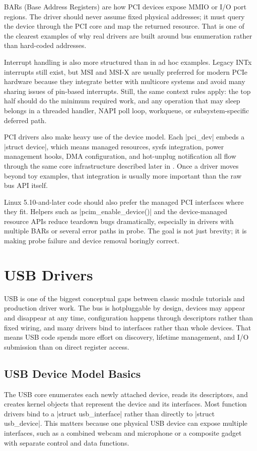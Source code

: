 \documentclass[10pt, oneside]{book}
\begin{document}
BARs (Base Address Registers) are how PCI devices expose MMIO or I/O port
regions.
The driver should never assume fixed physical addresses; it must query the
device through the PCI core and map the returned resource.
That is one of the clearest examples of why real drivers are built around bus
enumeration rather than hard-coded addresses.

Interrupt handling is also more structured than in ad hoc examples.
Legacy INTx interrupts still exist, but MSI and MSI-X are usually preferred for
modern PCIe hardware because they integrate better with multicore systems and
avoid many sharing issues of pin-based interrupts.
Still, the same context rules apply: the top half should do the minimum
required work, and any operation that may sleep belongs in a threaded handler,
NAPI poll loop, workqueue, or subsystem-specific deferred path.

PCI drivers also make heavy use of the device model.
Each \cpp|pci_dev| embeds a \cpp|struct device|, which means managed resources,
sysfs integration, power management hooks, DMA configuration, and hot-unplug
notification all flow through the same core infrastructure described later in
.
Once a driver moves beyond toy examples, that integration is usually more
important than the raw bus API itself.

Linux 5.10-and-later code should also prefer the managed PCI interfaces where they fit.
Helpers such as \cpp|pcim_enable_device()| and the device-managed resource
APIs reduce teardown bugs dramatically, especially in drivers with multiple BARs
or several error paths in probe.
The goal is not just brevity; it is making probe failure and device removal
boringly correct.

\section{USB Drivers}
\label{sec:usb}
USB is one of the biggest conceptual gaps between classic module tutorials and
production driver work.
The bus is hotpluggable by design, devices may appear and disappear at any
time, configuration happens through descriptors rather than fixed wiring, and
many drivers bind to interfaces rather than whole devices.
That means USB code spends more effort on discovery, lifetime management, and
I/O submission than on direct register access.

\subsection{USB Device Model Basics}
\label{sec:usb_basics}
The USB core enumerates each newly attached device, reads its descriptors, and
creates kernel objects that represent the device and its interfaces.
Most function drivers bind to a \cpp|struct usb_interface| rather than directly
to \cpp|struct usb_device|.
This matters because one physical USB device can expose multiple interfaces,
such as a combined webcam and microphone or a composite gadget with separate
control and data functions.
\end{document}
